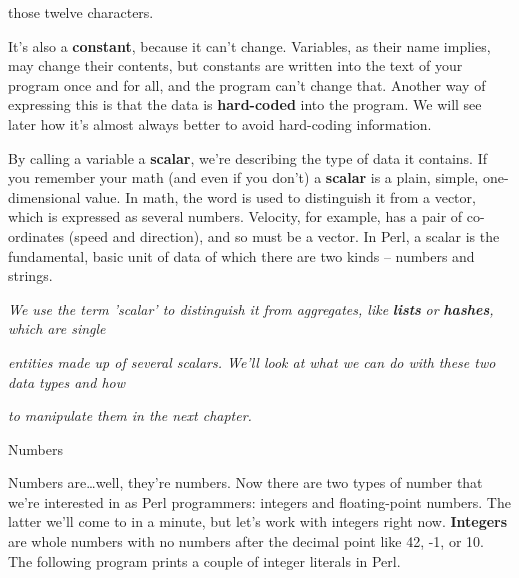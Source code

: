 \documentclass[a4paper,11pt]{book}
\begin{document}
\noindent those twelve characters.

\noindent 

\noindent It's also a \textbf{constant}, because it can't change. Variables, as their name implies, may change their contents, but constants are written into the text of your program once and for all, and the program can't change that. Another way of expressing this is that the data is \textbf{hard-coded }into the program. We will see later how it's almost always better to avoid hard-coding information.

\noindent  

\noindent  

\noindent  

\noindent  

\noindent 

\noindent 

\noindent By calling a variable a \textbf{scalar}, we're describing the type of data it contains. If you remember your math (and even if you don't) a \textbf{scalar }is a plain, simple, one-dimensional value. In math, the word is used to distinguish it from a vector, which is expressed as several numbers. Velocity, for example, has a pair of co-ordinates (speed and direction), and so must be a vector. In Perl, a scalar is the fundamental, basic unit of data of which there are two kinds -- numbers and strings.

\noindent 

\noindent \textit{We use the term 'scalar' to distinguish it from aggregates, like }\textbf{\textit{lists }}\textit{or }\textbf{\textit{hashes}}\textit{, which are single}

\noindent \textit{entities made up of several scalars. We'll look at what we can do with these two data types and how}

\noindent \textit{to manipulate them in the next chapter.}

\noindent 

\noindent 

\noindent Numbers

\noindent 

\noindent Numbers are\dots well, they're numbers. Now there are two types of number that we're interested in as Perl programmers: integers and floating-point numbers. The latter we'll come to in a minute, but let's work with integers right now. \textbf{Integers }are whole numbers with no numbers after the decimal point like 42, -1, or 10. The following program prints a couple of integer literals in Perl.
\end{document}
